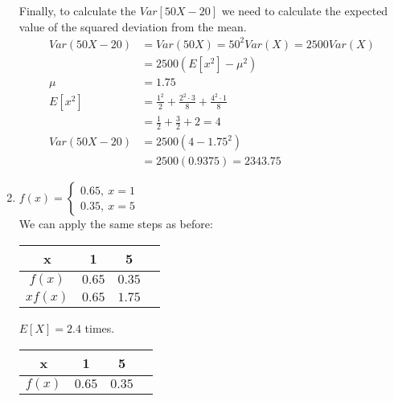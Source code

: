 \documentclass{article}
\begin{document}
\begin{enumerate}[label = \alph*)]
          Finally, to calculate the \(Var[50X - 20]\) we need to calculate the expected value of the squared deviation from the mean.
          \begin{align*}
              Var(50X - 20) & = Var(50X) = 50^2Var(X) = 2500Var(X)                                                        \\
                            & = 2500 (E[x^2] - \mu^2)                                                                     \\
              \mu           & = 1.75                                                                                      \\
              E[x^2]        & =                                 \frac{1^2}{2} + \frac{2^2\cdot3}{8} + \frac{4^2\cdot1}{8} \\
                            & = \frac{1}{2} + \frac{3}{2} + 2 = 4                                                         \\
              Var(50X - 20) & = 2500 (4 - 1.75^2)                                                                         \\
                            & = 2500 (0.9375) = 2343.75
          \end{align*}
    \item \(f(x) =
          \begin{cases}
              0.65,\ x = 1 \\
              0.35,\ x = 5
          \end{cases}
          \) \\
          We can apply the same steps as before:
          \begin{center}
              \begin{tabular}{c|ccc}
                  x         & 1        & 5        \\
                  \hline
                  \(f(x)\)  & \(0.65\) & \(0.35\) \\
                  \(xf(x)\) & \(0.65\) & \(1.75\)
              \end{tabular}
          \end{center}
          \(E[X] = 2.4\) times.
          \begin{center}
              \begin{tabular}{c|ccc}
                  x                  & 1        & 5        \\
                  \hline
                  \(f(x)\)           & \(0.65\) & \(0.35\) \\

\end{tabular}
\end{center}
\end{enumerate}
\end{document}
